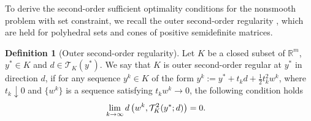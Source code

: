\documentclass[11pt]{article}
\theoremstyle{definition}
\newtheorem{definition}[theorem]{Definition}
\theoremstyle{remark}
\numberwithin{equation}{section}
\begin{document}
 To derive the second-order sufficient optimality conditions for the nonsmooth problem with set constraint, we recall the outer second-order regularity \cite[Definition 3.85]{Bonnans}, which are held for polyhedral sets and cones of
positive semidefinite matrices.

\begin{definition}[Outer second-order regularity]
 Let $K$ be a closed subset of $\mathbb{R}^m$,  $y^*\in K$ and $d\in\mathcal{T}_{K}(y^*)$. We say that $K$ is outer second-order regular at $y^*$ in direction $d$, if for any sequence $y^k\in K$ of the form
$y^k := y^* + t_kd +\frac{1}{2}t_k^2w^k$, where $t_k\downarrow0$ and $\{w^k\}$ is a sequence satisfying
$t_kw^k\to 0$, the following condition holds
\begin{align}\label{}
  &\lim_{k\to \infty} d\left(w^k,\mathcal{T}_{K}^2(y^*;d)\right)=0.\notag
\end{align}
\end{definition}
\end{document}
